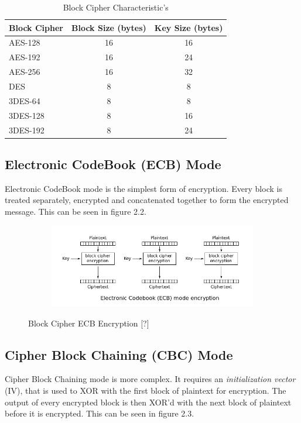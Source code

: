 \documentclass[bsc,frontabs,twoside,singlespacing,parskip,deptreport]{infthesis}     %
\begin{document}
\begin{table}[H]
\begin{tabular}{|l|c|c|}
\hline
Block Cipher & Block Size (bytes) & Key Size (bytes)\\
\hline
AES-128 & 16 & 16\\
AES-192 & 16 & 24\\
AES-256 & 16 & 32\\
\hline
DES & 8 & 8\\
\hline
3DES-64 & 8 & 8\\
3DES-128 & 8 & 16\\
3DES-192 & 8 & 24\\
\hline
\end{tabular}
\caption{Block Cipher Characteristic's}
\end{table}

\subsection{Electronic CodeBook (ECB) Mode}
Electronic CodeBook mode is the simplest form of encryption. Every block is treated separately, encrypted and concatenated together to form the encrypted message. This can be seen in figure 2.2.

\begin{figure}[H]
\centering
\begin{subfigure}{1.0\textwidth}
  \includegraphics[width=1\linewidth]
  {images/crypto/ecb.png}
\end{subfigure}
\caption{Block Cipher ECB Encryption [?]}
\end{figure}
\subsection{Cipher Block Chaining (CBC) Mode}

Cipher Block Chaining mode is more complex. It requires an \textit{initialization vector} (IV), that is used to XOR with the first block of plaintext for encryption. The output of every encrypted block is then XOR'd with the next block of plaintext before it is encrypted. This can be seen in figure 2.3.
\end{document}
